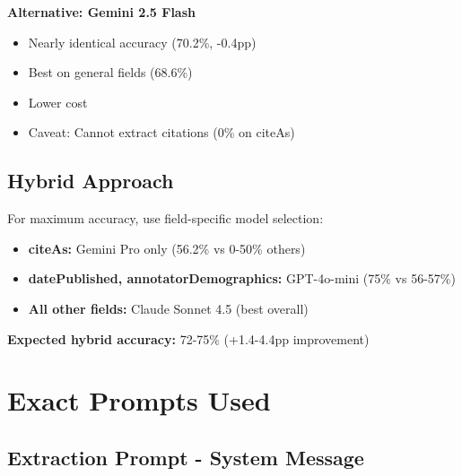 \documentclass[11pt,a4paper]{article}
\begin{document}
\textbf{Alternative: Gemini 2.5 Flash}
\begin{itemize}
    \item Nearly identical accuracy (70.2\%, -0.4pp)
    \item Best on general fields (68.6\%)
    \item Lower cost
    \item Caveat: Cannot extract citations (0\% on citeAs)
\end{itemize}

\subsection{Hybrid Approach}

For maximum accuracy, use field-specific model selection:
\begin{itemize}
    \item \textbf{citeAs:} Gemini Pro only (56.2\% vs 0-50\% others)
    \item \textbf{datePublished, annotatorDemographics:} GPT-4o-mini (75\% vs 56-57\%)
    \item \textbf{All other fields:} Claude Sonnet 4.5 (best overall)
\end{itemize}

\textbf{Expected hybrid accuracy:} 72-75\% (+1.4-4.4pp improvement)

\newpage

\appendix

\section{Exact Prompts Used}

\subsection{Extraction Prompt - System Message}
\end{document}
